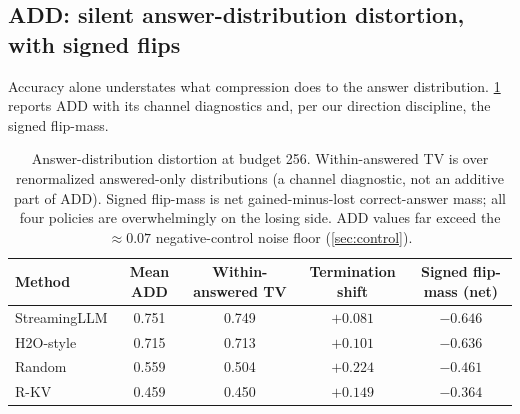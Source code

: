 \documentclass{article}
\begin{document}
\subsection{ADD: silent answer-distribution distortion, with signed flips}
\label{sec:add}
Accuracy alone understates what compression does to the answer distribution. \cref{tab:add} reports ADD with its channel diagnostics and, per our direction discipline, the signed flip-mass.

\begin{table}[t]
\centering
\caption{Answer-distribution distortion at budget 256. Within-answered TV is over renormalized answered-only distributions (a channel diagnostic, not an additive part of ADD). Signed flip-mass is net gained-minus-lost correct-answer mass; all four policies are overwhelmingly on the losing side. ADD values far exceed the $\approx 0.07$ negative-control noise floor (\cref{sec:control}).}
\label{tab:add}
\footnotesize
\begin{tabular}{lcccc}
\toprule
Method & Mean ADD & Within-answered TV & Termination shift & Signed flip-mass (net) \\
\midrule
StreamingLLM & 0.751 & 0.749 & $+0.081$ & $-0.646$ \\
H2O-style    & 0.715 & 0.713 & $+0.101$ & $-0.636$ \\
Random       & 0.559 & 0.504 & $+0.224$ & $-0.461$ \\
R-KV         & 0.459 & 0.450 & $+0.149$ & $-0.364$ \\
\bottomrule
\end{tabular}
\end{table}
\end{document}
